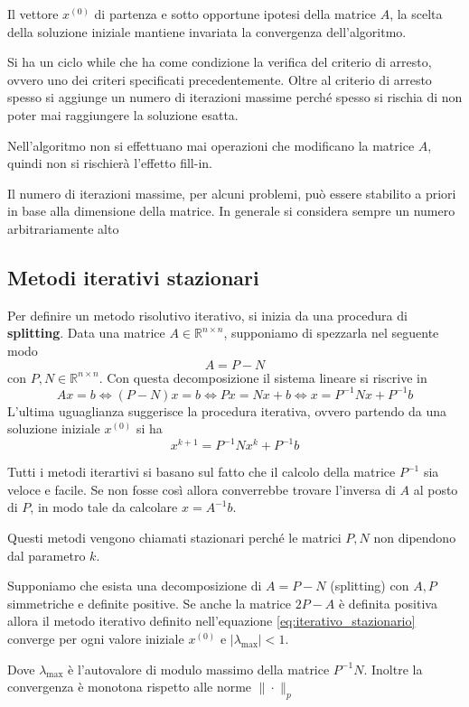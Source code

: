 Il vettore $x^{(0)}$ di partenza e sotto opportune ipotesi della matrice $A$, la
scelta della soluzione iniziale mantiene invariata la convergenza dell'algoritmo.

Si ha un ciclo while che ha come condizione la verifica del criterio di arresto,
ovvero uno dei criteri specificati precedentemente. Oltre al criterio di arresto
spesso si aggiunge un numero di iterazioni massime perché spesso si rischia di
non poter mai raggiungere la soluzione esatta.

Nell'algoritmo non si effettuano mai operazioni che modificano la matrice $A$,
quindi non si rischierà l'effetto fill-in.

\begin{nota}
    Il numero di iterazioni massime, per alcuni problemi, può essere stabilito
    a priori in base alla dimensione della matrice. In generale si considera
    sempre un numero arbitrariamente alto
\end{nota}




\subsection{Metodi iterativi stazionari}
Per definire un metodo risolutivo iterativo, si inizia da una procedura di \textbf{splitting}.
Data una matrice $A\in \mathbb{R}^{n\times n}$, supponiamo di spezzarla nel seguente
modo
$$A=P-N$$
con $P,N\in \mathbb{R}^{n\times n}$. Con questa decomposizione il sistema lineare
si riscrive in
$$Ax= b \iff (P-N)x= b \iff Px = Nx+b \iff x= P^{-1}Nx+P^{-1}b$$
L'ultima uguaglianza suggerisce la procedura iterativa, ovvero partendo da una
soluzione iniziale $x^{(0)}$ si ha
\begin{equation}
    x^{k+1} =  P^{-1}Nx^{k}+P^{-1}b
    \label{eq:iterativo_stazionario}
\end{equation}

Tutti i metodi iterartivi si basano sul fatto che il calcolo della matrice $P^{-1}$
sia veloce e facile. Se non fosse così allora converrebbe trovare l'inversa di
$A$ al posto di $P$, in modo tale da calcolare $x=A^{-1}b$.

Questi metodi vengono chiamati stazionari perché le matrici $P,N$ non dipendono
dal parametro $k$.

\begin{teorema}
    \label{th:metodi_iterativi}
    Supponiamo che esista una decomposizione di $A=P-N $ (splitting) con $A, P$ simmetriche
    e definite positive. Se anche la matrice $2P-A$ è definita positiva allora
    il metodo iterativo definito nell'equazione \ref{eq:iterativo_stazionario}
    converge per ogni valore iniziale $x^{(0)}$ e $|\lambda_{\max}| < 1$.

    Dove $\lambda_{\max}$ è l'autovalore di modulo massimo della matrice $P^{-1}N$.
    Inoltre la convergenza è monotona rispetto alle norme $\|\cdot\|_p$
\end{teorema}

